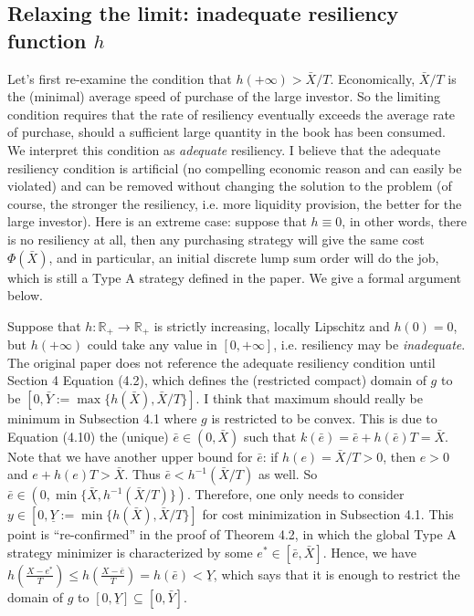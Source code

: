 \documentclass[openany,oneside]{article}
\theoremstyle{definition}
\theoremstyle{remark}
\begin{document}
\subsection{Relaxing the limit: inadequate resiliency function $h$}
Let's first re-examine the condition that $h(+\infty) > \bar{X}/T$. Economically, $\bar{X}/T$ is the (minimal) average speed of purchase of the large investor. So the limiting condition requires that the rate of resiliency eventually exceeds the average rate of purchase, should a sufficient large quantity in the book has been consumed. We interpret this condition as \emph{adequate} resiliency. I believe that the adequate resiliency condition is artificial (no compelling economic reason and can easily be violated)  and can be removed without changing the solution to the problem (of course, the stronger the resiliency, i.e. more liquidity provision, the better for the large investor). Here is an extreme case: suppose that $h\equiv 0$, in other words, there is no resiliency at all, then any purchasing strategy will give the same cost $\Phi(\bar{X})$, and in particular, an initial discrete lump sum order will do the job, which is still a Type A strategy defined in the paper. We give a formal argument below.

Suppose that $h:\mathbb{R}_+ \to \mathbb{R}_+$ is strictly increasing, locally Lipschitz and $h(0)=0$, but $h(+\infty)$ could take any value in $[0,+\infty]$, i.e. resiliency may be \emph{inadequate}. The original paper does not reference the adequate resiliency condition until Section 4 Equation (4.2), which defines the (restricted compact) domain of $g$ to be $\left[0, \bar{Y}:=\max\{h(\bar{X}), \bar{X}/T\} \right]$. I think that maximum should really be minimum in Subsection 4.1 where $g$ is restricted to be convex. This is due to Equation (4.10) the (unique) $\bar{e} \in (0,\bar{X})$ such that $k(\bar{e}) = \bar{e} + h(\bar{e}) T = \bar{X}$. Note that we have another upper bound for $\bar{e}$: if $h(e) = \bar{X}/T >0$, then $e>0$ and $e+h(e)T > \bar{X}$. Thus $\bar{e} < h^{-1}(\bar{X}/T)$ as well. So $\bar{e} \in \left(0, \min\{\bar{X}, h^{-1}(\bar{X}/T)\} \right)$. Therefore, one only needs to consider $y\in [0, \underline{Y}:=\min\{h(\bar{X}), \bar{X}/T\}]$ for cost minimization in Subsection 4.1. This point is ``re-confirmed'' in the proof of Theorem 4.2, in which the global Type A strategy minimizer is characterized by some $e^\ast \in [\bar{e}, \bar{X}]$. Hence, we have $h\left(\frac{X-e^\ast}{T}\right) \le h\left(\frac{X-\bar{e}}{T}\right) = h(\bar{e}) < \underline{Y}$, which says that it is enough to restrict the domain of $g$ to $[0,\underline{Y}] \subseteq [0,\bar{Y}]$.
\end{document}
